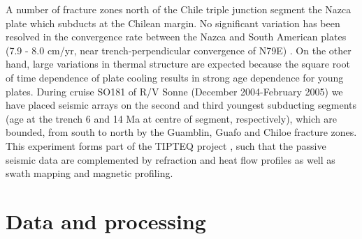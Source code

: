 \documentclass[reviewcopy]{elsarticle}
\begin{document}
A number of fracture zones north of the Chile triple junction segment
the Nazca plate which subducts at the Chilean margin. No significant
variation has been resolved in
%
%
the convergence rate between the Nazca and South American
plates (7.9  - 8.0 cm/yr, near trench-perpendicular convergence of
N79E) \citep{demets94}.
On the other hand, large variations in thermal structure are expected
because the square root of time dependence of plate cooling results in
strong age dependence for young plates.
During cruise SO181 of R/V Sonne (December 2004-February 2005) we have placed seismic arrays on the second and
third youngest subducting
segments (age at the trench 6 and 14 Ma at centre of segment, respectively), which are
bounded, from south to north by the Guamblin, Guafo and Chiloe
fracture zones.  This
experiment forms part of the TIPTEQ project \citep{scherwath06}, such that the passive
seismic data are complemented by refraction and heat flow profiles as
well as swath mapping and magnetic profiling.

\section{Data and processing}
\end{document}
